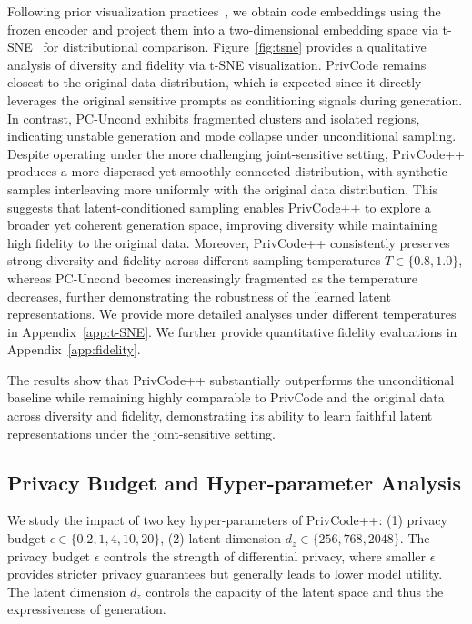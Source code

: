 \documentclass{article}
\theoremstyle{plain}
\theoremstyle{definition}
\theoremstyle{remark}
\def \toolname{PrivCode++}
\begin{document}
{Following prior visualization practices~\cite{gong2025privorl}, we obtain code embeddings using the frozen encoder and project them into a two-dimensional embedding space via t-SNE~\cite{van2008visualizing} for distributional comparison. Figure~\ref{fig:tsne} provides a qualitative analysis of diversity and fidelity via t-SNE visualization. PrivCode remains closest to the original data distribution, which is expected since it directly leverages the original sensitive prompts as conditioning signals during generation. In contrast, PC-Uncond exhibits fragmented clusters and isolated regions, indicating unstable generation and mode collapse under unconditional sampling. 
Despite operating under the more challenging joint-sensitive setting, \toolname{} produces a more dispersed yet smoothly connected distribution, with synthetic samples interleaving more uniformly with the original data distribution. This suggests that latent-conditioned sampling enables \toolname{} to explore a broader yet coherent generation space, improving diversity while maintaining high fidelity to the original data. Moreover, \toolname{} consistently preserves strong diversity and fidelity across different sampling temperatures $T \in \{0.8, 1.0\}$, whereas PC-Uncond becomes increasingly fragmented as the temperature decreases, further demonstrating the robustness of the learned latent representations. We provide more detailed analyses under different temperatures in Appendix~\ref{app:t-SNE}. We further provide quantitative fidelity evaluations in Appendix~\ref{app:fidelity}.

The results show that \toolname{} substantially outperforms the unconditional baseline while remaining highly comparable to PrivCode and the original data across diversity and fidelity, demonstrating its ability to learn faithful latent representations under the joint-sensitive setting.


\subsection{Privacy Budget and Hyper-parameter Analysis}
\label{sec:hyper analysis}


We study the impact of two key hyper-parameters of \toolname{}: (1) privacy budget $\epsilon \in \{0.2, 1, 4, 10, 20\}$, (2) latent dimension $d_z \in \{256, 768, 2048\}$.
The privacy budget $\epsilon$ controls the strength of differential privacy, where smaller $\epsilon$ provides stricter privacy guarantees but generally leads to lower model utility.
The latent dimension $d_z$ controls the capacity of the latent space and thus the expressiveness of generation.

}
\end{document}
